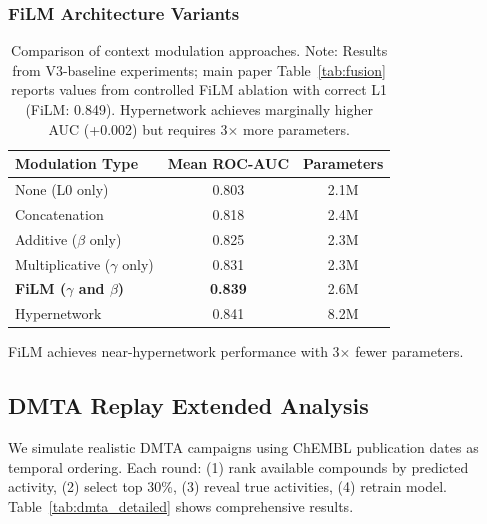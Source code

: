 \documentclass[sigconf,anonymous]{acmart}
\begin{document}
\subsubsection{FiLM Architecture Variants}

\begin{table}[t]
\caption{Comparison of context modulation approaches. Note: Results from V3-baseline experiments; main paper Table~\ref{tab:fusion} reports values from controlled FiLM ablation with correct L1 (FiLM: 0.849). Hypernetwork achieves marginally higher AUC (+0.002) but requires 3$\times$ more parameters.}
\label{tab:film_variants}
\centering
\small
\begin{tabular}{@{}lcc@{}}
\toprule
Modulation Type & Mean ROC-AUC & Parameters \\
\midrule
None (L0 only) & 0.803 & 2.1M \\
Concatenation & 0.818 & 2.4M \\
Additive ($\beta$ only) & 0.825 & 2.3M \\
Multiplicative ($\gamma$ only) & 0.831 & 2.3M \\
\textbf{FiLM ($\gamma$ and $\beta$)} & \textbf{0.839} & 2.6M \\
Hypernetwork & 0.841 & 8.2M \\
\bottomrule
\end{tabular}
\end{table}

FiLM achieves near-hypernetwork performance with 3$\times$ fewer parameters.

\subsection{DMTA Replay Extended Analysis}

We simulate realistic DMTA campaigns using ChEMBL publication dates as temporal ordering. Each round: (1) rank available compounds by predicted activity, (2) select top 30\%, (3) reveal true activities, (4) retrain model. Table~\ref{tab:dmta_detailed} shows comprehensive results.
\end{document}
